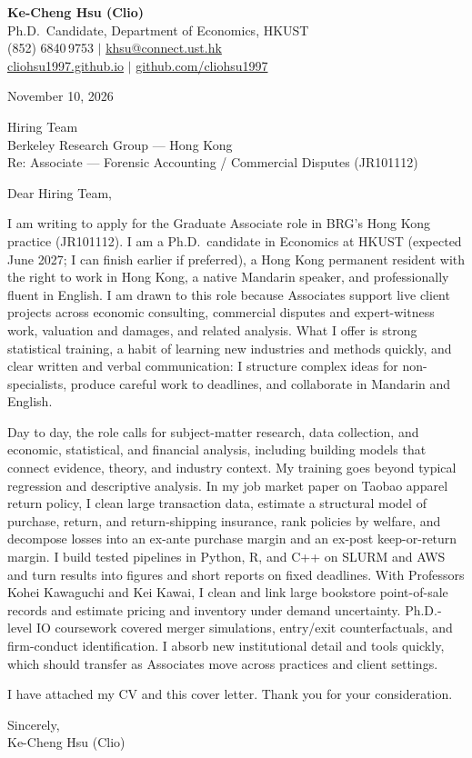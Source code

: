 \documentclass[11pt,letterpaper]{article}
\begin{document}
\noindent
{\bfseries Ke-Cheng Hsu (Clio)}\\
Ph.D.\ Candidate, Department of Economics, HKUST\\
(852) 6840\,9753 \quad $|$ \quad \href{mailto:khsu@connect.ust.hk}{khsu@connect.ust.hk}\\
\href{https://cliohsu1997.github.io/}{cliohsu1997.github.io} \quad $|$ \quad \href{https://github.com/cliohsu1997}{github.com/cliohsu1997}

\vspace{0.7em}
\noindent
November 10, 2026

\vspace{0.35em}
\noindent
Hiring Team\\
Berkeley Research Group --- Hong Kong\\
Re: Associate --- Forensic Accounting / Commercial Disputes (JR101112)

\vspace{0.2em}
Dear Hiring Team,

I am writing to apply for the Graduate Associate role in BRG's Hong Kong practice (JR101112). I am a Ph.D.\ candidate in Economics at HKUST (expected June 2027; I can finish earlier if preferred), a Hong Kong permanent resident with the right to work in Hong Kong, a native Mandarin speaker, and professionally fluent in English. I am drawn to this role because Associates support live client projects across economic consulting, commercial disputes and expert-witness work, valuation and damages, and related analysis. What I offer is strong statistical training, a habit of learning new industries and methods quickly, and clear written and verbal communication: I structure complex ideas for non-specialists, produce careful work to deadlines, and collaborate in Mandarin and English.

Day to day, the role calls for subject-matter research, data collection, and economic, statistical, and financial analysis, including building models that connect evidence, theory, and industry context. My training goes beyond typical regression and descriptive analysis. In my job market paper on Taobao apparel return policy, I clean large transaction data, estimate a structural model of purchase, return, and return-shipping insurance, rank policies by welfare, and decompose losses into an ex-ante purchase margin and an ex-post keep-or-return margin. I build tested pipelines in Python, R, and C++ on SLURM and AWS and turn results into figures and short reports on fixed deadlines. With Professors Kohei Kawaguchi and Kei Kawai, I clean and link large bookstore point-of-sale records and estimate pricing and inventory under demand uncertainty. Ph.D.-level IO coursework covered merger simulations, entry/exit counterfactuals, and firm-conduct identification. I absorb new institutional detail and tools quickly, which should transfer as Associates move across practices and client settings.

I have attached my CV and this cover letter. Thank you for your consideration.

\vspace{0.7em}
Sincerely,\\[1.0em]
Ke-Cheng Hsu (Clio)
\end{document}
